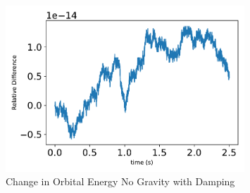 \begin{figure}[htbp]\centerline{\includegraphics[width=0.8\textwidth]{AutoTeX/ChangeInOrbitalEnergyNoGravityDamping}}\caption{Change in Orbital Energy No Gravity with Damping}\label{fig:ChangeInOrbitalEnergyNoGravityDamping}\end{figure}